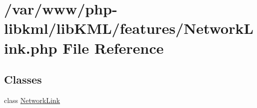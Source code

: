 \hypertarget{NetworkLink_8php}{
\section{/var/www/php-\/libkml/libKML/features/NetworkLink.php File Reference}
\label{d2/d0d/NetworkLink_8php}
}
\subsection*{Classes}
\begin{DoxyCompactItemize}
\item 
class \hyperlink{classNetworkLink}{NetworkLink}
\end{DoxyCompactItemize}
